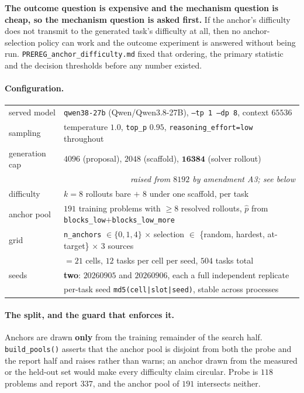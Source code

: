 \textbf{The outcome question is expensive and the mechanism question is cheap, so the mechanism
question is asked first.} If the anchor's difficulty does not transmit to the generated task's
difficulty at all, then no anchor-selection policy can work and the outcome experiment is
answered without being run. \texttt{PREREG\_anchor\_difficulty.md} fixed that ordering, the
primary statistic and the decision thresholds before any number existed.

\paragraph{Configuration.}

\begin{center}\small
\begin{tabular}{ll}
\toprule
served model & \texttt{qwen38-27b} (Qwen/Qwen3.8-27B), \texttt{--tp 1 --dp 8}, context $65536$ \\
sampling & temperature $1.0$, \texttt{top\_p} $0.95$, \texttt{reasoning\_effort=low} throughout \\
generation cap & $4096$ (proposal), $2048$ (scaffold), $\mathbf{16384}$ (solver rollout) \\
              & \multicolumn{1}{r}{\emph{raised from $8192$ by amendment A3; see below}} \\
difficulty & $k=8$ rollouts bare $+$ $8$ under one scaffold, per task \\
anchor pool & $191$ training problems with $\ge 8$ resolved rollouts, $\hat p$ from
              \texttt{blocks\_low}$+$\texttt{blocks\_low\_more} \\
grid & \texttt{n\_anchors} $\in \{0,1,4\}$ $\times$ selection $\in$
       \{random, hardest, at-target\} $\times$ $3$ sources \\
     & $=21$ cells, $12$ tasks per cell per seed, $504$ tasks total \\
seeds & \textbf{two}: $20260905$ and $20260906$, each a full independent replicate \\
      & per-task seed \texttt{md5(cell|slot|seed)}, stable across processes \\
\bottomrule
\end{tabular}
\end{center}

\paragraph{The split, and the guard that enforces it.} Anchors are drawn \textbf{only} from the
training remainder of the search half. \texttt{build\_pools()} asserts that the anchor pool is
disjoint from both the probe and the report half and raises rather than warns; an anchor drawn
from the measured or the held-out set would make every difficulty claim circular. Probe is
$118$ problems and report $337$, and the anchor pool of $191$ intersects neither.

